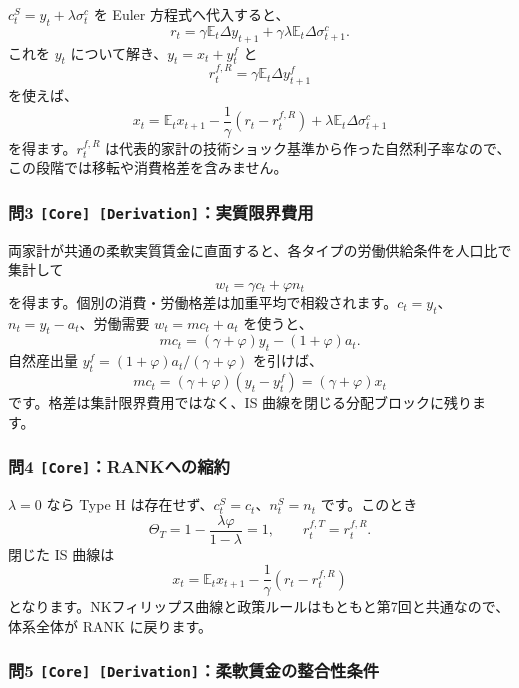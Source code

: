 \documentclass[
  japanese,
  lualatex,
  ja=standard,
  11pt,
  a4paper]{ltjsarticle}
\begin{document}
\(c_t^S=y_t+\lambda\sigma_t^c\) を Euler 方程式へ代入すると、 \[
r_t=\gamma\mathbb E_t\Delta y_{t+1}
+\gamma\lambda\mathbb E_t\Delta\sigma_{t+1}^c.
\] これを \(y_t\) について解き、\(y_t=x_t+y_t^f\) と \[
r_t^{f,R}=\gamma\mathbb E_t\Delta y_{t+1}^f
\] を使えば、 \[
x_t=\mathbb E_tx_{t+1}
-\frac1\gamma(r_t-r_t^{f,R})
+\lambda\mathbb E_t\Delta\sigma_{t+1}^c
\] を得ます。\(r_t^{f,R}\)
は代表的家計の技術ショック基準から作った自然利子率なので、この段階では移転や消費格差を含みません。

\subsubsection{\texorpdfstring{問3
\texttt{{[}Core{]}\ {[}Derivation{]}}：実質限界費用}{問3 {[}Core{]} {[}Derivation{]}：実質限界費用}}\label{ux554f3-core-derivationux5b9fux8ceaux9650ux754cux8cbbux7528}

両家計が共通の柔軟実質賃金に直面すると、各タイプの労働供給条件を人口比で集計して
\[
w_t=\gamma c_t+\varphi n_t
\]
を得ます。個別の消費・労働格差は加重平均で相殺されます。\(c_t=y_t\)、\(n_t=y_t-a_t\)、労働需要
\(w_t=mc_t+a_t\) を使うと、 \[
mc_t=(\gamma+\varphi)y_t-(1+\varphi)a_t.
\] 自然産出量 \(y_t^f=(1+\varphi)a_t/(\gamma+\varphi)\) を引けば、 \[
mc_t=(\gamma+\varphi)(y_t-y_t^f)
=(\gamma+\varphi)x_t
\] です。格差は集計限界費用ではなく、IS
曲線を閉じる分配ブロックに残ります。

\subsubsection{\texorpdfstring{問4
\texttt{{[}Core{]}}：RANKへの縮約}{問4 {[}Core{]}：RANKへの縮約}}\label{ux554f4-corerankux3078ux306eux7e2eux7d04}

\(\lambda=0\) なら Type H は存在せず、\(c_t^S=c_t\)、\(n_t^S=n_t\)
です。このとき \[
\Theta_T=1-\frac{\lambda\varphi}{1-\lambda}=1,
\qquad
r_t^{f,T}=r_t^{f,R}.
\] 閉じた IS 曲線は \[
x_t=\mathbb E_tx_{t+1}-\frac1\gamma(r_t-r_t^{f,R})
\]
となります。NKフィリップス曲線と政策ルールはもともと第7回と共通なので、体系全体が
RANK に戻ります。

\subsubsection{\texorpdfstring{問5
\texttt{{[}Core{]}\ {[}Derivation{]}}：柔軟賃金の整合性条件}{問5 {[}Core{]} {[}Derivation{]}：柔軟賃金の整合性条件}}\label{ux554f5-core-derivationux67d4ux8edfux8cc3ux91d1ux306eux6574ux5408ux6027ux6761ux4ef6}
\end{document}

